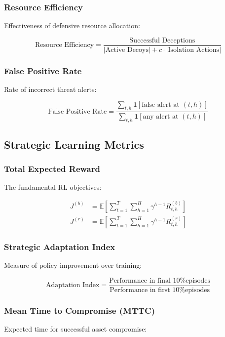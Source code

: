 \documentclass[11pt]{article}
\theoremstyle{definition}
\theoremstyle{plain}
\newcommand{\EE}{\mathbb{E}}
\begin{document}
\subsubsection{Resource Efficiency}
Effectiveness of defensive resource allocation:

\begin{equation}
\text{Resource Efficiency} = \frac{\text{Successful Deceptions}}{|\text{Active Decoys}| + c \cdot |\text{Isolation Actions}|}
\end{equation}

\subsubsection{False Positive Rate}
Rate of incorrect threat alerts:

\begin{equation}
\text{False Positive Rate} = \frac{\sum_{t,h} \mathbf{1}[\text{false alert at } (t,h)]}{\sum_{t,h} \mathbf{1}[\text{any alert at } (t,h)]}
\end{equation}

\subsection{Strategic Learning Metrics}

\subsubsection{Total Expected Reward}
The fundamental RL objectives:

\begin{align}
J^{(b)} &= \EE\left[\sum_{t=1}^{T} \sum_{h=1}^{H} \gamma^{h-1} R_{t,h}^{(b)}\right] \\
J^{(r)} &= \EE\left[\sum_{t=1}^{T} \sum_{h=1}^{H} \gamma^{h-1} R_{t,h}^{(r)}\right]
\end{align}

\subsubsection{Strategic Adaptation Index}
Measure of policy improvement over training:

\begin{equation}
\text{Adaptation Index} = \frac{\text{Performance in final 10\% episodes}}{\text{Performance in first 10\% episodes}}
\end{equation}

\subsubsection{Mean Time to Compromise (MTTC)}
Expected time for successful asset compromise:
\end{document}
